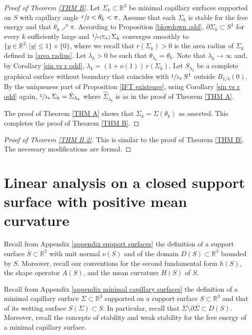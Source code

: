 \documentclass[11pt]{amsart}
\begin{document}
\begin{proof}[Proof of Theorem \ref{THM B}]
Let $\Sigma_k\subset \mathbb{R}^3$ be   minimal capillary surfaces supported on $S$ with capillary angle $\sfrac{\pi}2<\theta_k<\pi$. Assume that each $\Sigma_k$ is stable  for the free energy and that $\theta_k\nearrow \pi$. According to Proposition \ref{blowdown odd},  $\partial \Sigma_k\subset S^1$ for every $k$ sufficiently large and  $\sfrac{1}{r(\Sigma_k)}\,\Sigma_k$ converges smoothly to $\{y\in \mathbb{R}^2:|y|\leq 1\}\times\{0\}$, where we recall that $r(\Sigma_k)>0$ is  the area radius of $\Sigma_k$ defined in \eqref{area radius}. Let  $\lambda_k>0$ be such that $\theta_{\lambda_k}=\theta_k$.
	Note that $\lambda_k\to \infty$ and, by Corollary \ref{sin vs r odd}, $\lambda_k=(1+o(1))\,r(\Sigma_k)$. Let $S_{\lambda_k}$ be a complete graphical surface without boundary  that coincides with $\sfrac{1}{\lambda_k}\,S^1$ outside $B_{1/4}(0)$. By the uniqueness part of Proposition \ref{IFT existence}, using  Corollary \ref{sin vs r odd} again, $\sfrac{1}{\lambda_k}\,\Sigma_k=\hat \Sigma_{\lambda_k}$ where $\hat  \Sigma_{\lambda_k}$ is as in the proof of Theorem \ref{THM A}. 
	
	The proof of Theorem \ref{THM A} shows that $\Sigma_k=\Sigma(\theta_k)$ as asserted. This completes the proof of Theorem \ref{THM B}.
	\end{proof}
	\begin{proof}[Proof of Theorem \ref{THM B 2}]
		This is similar to the proof of Theorem \ref{THM B}. The necessary modifications are formal.
	\end{proof}


\section{Linear analysis on a closed support surface with positive mean curvature}

	Recall from Appendix \ref{appendix support surfaces} the definition of a support surface $S\subset \mathbb{R}^3$ with unit normal $\nu(S)$  and of the domain $D(S)\subset \mathbb{R}^3$ bounded by $S$.  Moreover, recall   our conventions for the second fundamental form $h(S)$, the shape operator $A(S)$, and the mean curvature $H(S)$ of $S$. 



Recall from Appendix \ref{appendix minimal capillary surfaces}  the  definition of a minimal capillary surface $\Sigma \subset \mathbb{R}^3$ supported on a support surface $S\subset \mathbb{R}^3$  and that of its  wetting surface $S(\Sigma)\subset S$. In particular, recall that  $\Sigma\setminus \partial \Sigma \subset D(S)$.  Moreover, recall the concepts of  stability and weak stability for the free energy  of a minimal capillary surface.
\end{document}
